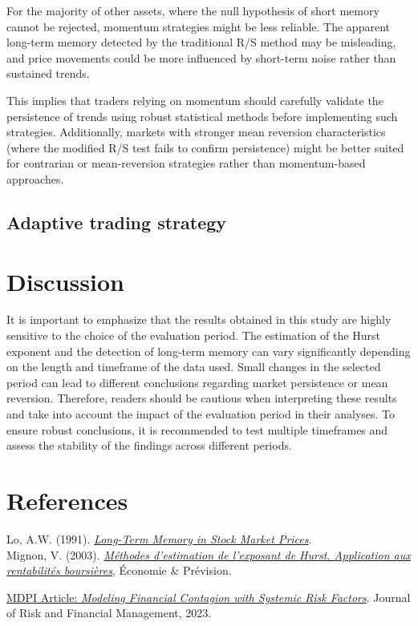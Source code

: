 \documentclass[11pt]{extarticle}
\begin{document}
For the majority of other assets, where the null hypothesis of short memory cannot be rejected, momentum strategies might be less reliable.
The apparent long-term memory detected by the traditional R/S method may be misleading, and price movements could be more influenced by short-term noise rather than sustained trends.

This implies that traders relying on momentum should carefully validate the persistence of trends using robust statistical methods before implementing
such strategies. Additionally, markets with stronger mean reversion characteristics (where the modified R/S test fails to confirm persistence) might
be better suited for contrarian or mean-reversion strategies rather than momentum-based approaches.

\subsection{Adaptive trading strategy}



\section{Discussion}

It is important to emphasize that the results obtained in this study are highly sensitive to the choice of the evaluation period.
The estimation of the Hurst exponent and the detection of long-term memory can vary significantly depending on the length and timeframe of the data used.
Small changes in the selected period can lead to different conclusions regarding market persistence or mean reversion.
Therefore, readers should be cautious when interpreting these results and take into account the impact of the evaluation period in their analyses.
To ensure robust conclusions, it is recommended to test multiple timeframes and assess the stability of the findings across different periods.



\section{References}

Lo, A.W. (1991). \textit{\href{http://www.e-m-h.org/Lo\_\_91.pdf}{Long-Term Memory in Stock Market Prices}}. \\

Mignon, V. (2003). \textit{\href{https://www.persee.fr/doc/ecop_0249-4744_1998_num_132_1_5909}{Méthodes d'estimation de l'exposant de Hurst. Application aux rentabilités boursières}}, Économie \& Prévision.

\href{https://www.mdpi.com/1911-8074/16/5/272}{MDPI Article: \textit{Modeling Financial Contagion with Systemic Risk Factors}}. Journal of Risk and Financial Management, 2023.
\end{document}
